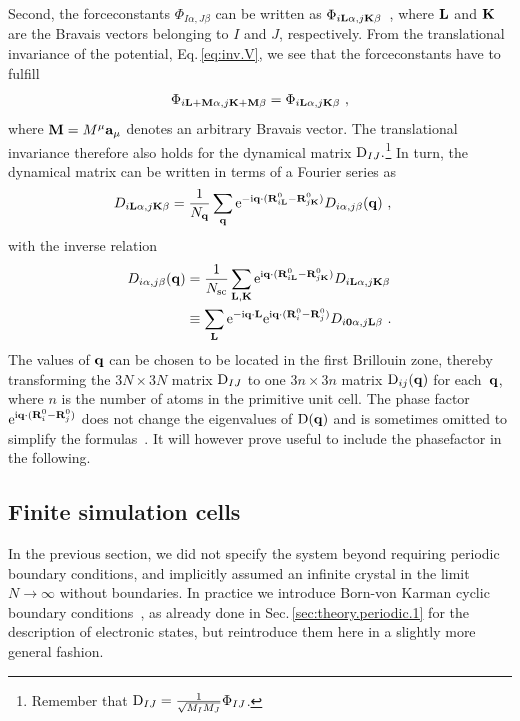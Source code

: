 Second, the forceconstants $\Phi_{I \alpha, J \beta}$ can be written as $\Phi_{i {\bf L} \alpha, j {\bf K} \beta}$~, where $\bf L$ and ${\bf K}$ are the Bravais vectors belonging to $I$ and $J$, respectively. From the translational invariance of the potential, Eq.\,\eqref{eq:inv.V}, we see that the forceconstants have to fulfill
\begin{align}
	\Phi_{i {\bf L} + \b M \alpha, j {\bf K} + \b M \beta} 
		= \Phi_{i {\bf L} \alpha, j {\bf K} \beta}~,
	\label{eq:fc.sym.1}
\end{align}
where ${\bf M} = M^\mu {\bf a}_\mu$ denotes an arbitrary Bravais vector. The translational invariance therefore also holds for the dynamical matrix ${\rm D}_{IJ}.$\footnote{Remember that ${\rm D}_{IJ} = \frac{1}{\sqrt{M_I M_J}} \Phi_{IJ}$.} In turn, the dynamical matrix can be written in terms of a Fourier series as
\begin{align}
	D_{i \b L \alpha, j \b K \beta}  
		& = \frac{1}{N_{\b q}} \sum_{\b q} {\rm e}^{- \im \b q \cdot (\b R_{i \b L}^0 - \b R_{j \b K}^0)} {D}_{i \alpha, j \beta} (\b q)~,
	\label{eq:D_{iLa}}
\end{align}
with the inverse relation
\begin{align}
	{D}_{i \alpha, j \beta} (\b q) 	
		&= \frac{1}{N_{\rm sc}} 
			\sum_{\b L, \b K} 
			{\rm e}^{\im \b q \cdot (\b R^0_{i \b L} - \b R^0_{j \b K})} {D}_{i \b L \alpha, j \b K \beta} \\
		&\equiv \sum_{\b L} {\rm e}^{- \im \b q \cdot \b L} {\rm e}^{\im \b q \cdot (\b R_i^0 - \b R_j^0)} {D}_{i \b 0 \alpha, j \b L \beta}~.
	\label{eq:D(q)}
\end{align}
The values of ${\bf q}$ can be chosen to be located in the first Brillouin zone, thereby transforming the $3N \times 3N$ matrix ${\rm D}_{IJ}$ to one $3n \times 3n$ matrix ${\rm D}_{ij} (\bf q)$ for each~${\bf q}$, where $n$ is the number of atoms in the primitive unit cell. The phase factor ${\rm e}^{{\rm i} {\bf q} \cdot ({\bf R}_i^0 - {\bf R}_j^0)}$ does not change the eigenvalues of ${\rm D} ({\bf q})$ and is sometimes omitted to simplify the formulas~\cite{BornHuang}. It will however prove useful to include the phasefactor in the following.

\subsection{Finite simulation cells}
In the previous section, we did not specify the system beyond requiring periodic boundary conditions, and implicitly assumed an infinite crystal in the limit $N \to \infty$ without boundaries. In practice we introduce Born-von Karman cyclic boundary conditions~\cite{born2013atomtheorie}, as already done in Sec.\,\ref{sec:theory.periodic.1} for the description of electronic states, but reintroduce them here in a slightly more general fashion.

